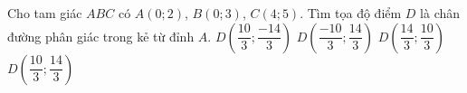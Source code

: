 \begin{vd}%
	 Cho tam giác $ABC$ có $A(0;2)$, $B(0;3)$, $C(4;5)$. Tìm tọa độ điểm $D$ là chân đường phân giác trong kẻ từ đỉnh $A$.
	\choice
{$D\left( \dfrac{10}{3}; \dfrac{-14}{3}\right) $}
{$D\left( \dfrac{-10}{3}; \dfrac{14}{3}\right) $}
{$D\left( \dfrac{14}{3}; \dfrac{10}{3}\right) $}
{\True $D\left( \dfrac{10}{3}; \dfrac{14}{3}\right) $}
\end{vd}
